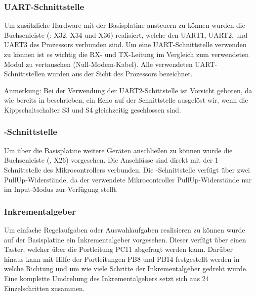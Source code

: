 
\subsubsection{UART-Schnittstelle}
Um zusätzliche Hardware mit der \gls{Basisplatine} ansteuern zu können wurden die Buchsenleiste (: X32, X34 und X36) realisiert, welche den UART1, UART2, und UART3 des Prozessors verbunden sind. Um eine UART-Schnittstelle verwenden zu können ist es wichtig die RX- und TX-Leitung im Vergleich zum verwendeten Modul zu vertauschen (Null-Modem-Kabel). Alle verwendeten UART-Schnittstellen wurden aus der Sicht des Prozessors bezeichnet.

\begin{warning}
    Anmerkung: Bei der Verwendung der UART2-Schittstelle ist Vorsicht geboten, da wie bereits in  beschrieben, ein Echo auf der Schnittstelle ausgelöst wir, wenn die Kippschaltschalter S3 und S4 gleichzeitig geschlossen sind.
\end{warning}


\subsubsection{\IIC{}-Schnittstelle}
Um über die \gls{Basisplatine} weitere \IIC{} Geräten anschließen zu können wurde die Buchsenleiste (, X26) vorgesehen. Die Anschlüsse sind direkt mit der \IIC{}1 Schnittstelle des Mikrocontrollers verbunden. Die \IIC{}-Schnittstelle verfügt über zwei PullUp-Widerstände, da der verwendete Mikrocontroller PullUp-Widerstände nur im Input-Modus zur Verfügung stellt.


\subsubsection{Inkrementalgeber}
Um einfache Regelaufgaben oder Auswahlaufgaben realisieren zu können wurde auf der \gls{Basisplatine} ein Inkrementalgeber vorgesehen. Dieser verfügt über einen Taster, welcher über die Portleitung PC11 abgefragt werden kann. Darüber hinaus kann mit Hilfe der Portleitungen PB8 und PB14 festgestellt werden in welche Richtung und um wie viele Schritte der Inkrementalgeber gedreht wurde. Eine komplette Umdrehung des Inkrementalgebers setzt sich aus 24 Einzelschritten zusammen.

